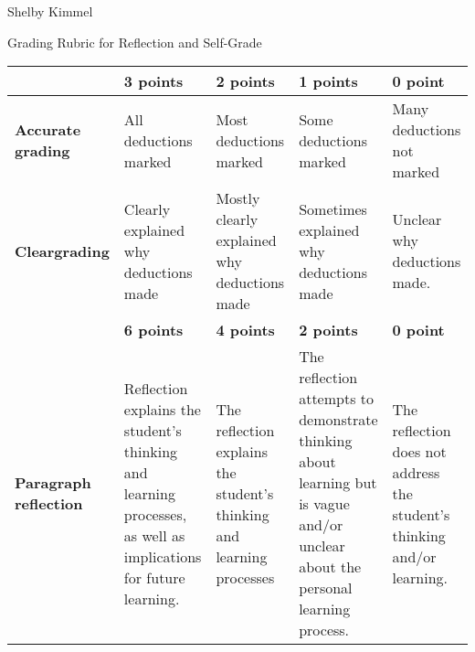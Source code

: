 \documentclass[12pt,landscape]{article}
\begin{document}
\hfill Shelby Kimmel

\begin{center}
{\huge Grading Rubric for Reflection and Self-Grade}
\end{center}



{\renewcommand{\arraystretch}{2}
\begin{tabular}{|p{2.3cm}|p{4.2cm}|p{4.2cm}|p{4.2cm}|p{4.2cm}|}
\hline
 & {\bf 3 points} & {\bf 2 points} & {\bf 1 points} & {\bf 0 point} \\
\hline
{\bf Accurate grading }& 
 All deductions marked & 
 Most deductions marked& 
 Some deductions marked & 
 Many deductions not marked\\
\hline
{\bf Clear\newline grading }& 
Clearly explained why deductions made & 
Mostly clearly explained why deductions made & 
Sometimes explained why deductions made & 
Unclear why deductions made.\\
\hline
 & {\bf 6 points} & {\bf 4 points} & {\bf 2 points} & {\bf 0 point} \\
\hline
{\bf Paragraph reflection}&
Reflection explains the student's thinking and learning processes, as well as implications for future learning.& 
The reflection explains the student's thinking and learning processes&
The reflection attempts to demonstrate thinking about learning but is vague and/or unclear about the personal learning process.&
The reflection does not address the student's thinking and/or learning.\\
\hline
 \end{tabular}
}
\end{document}
